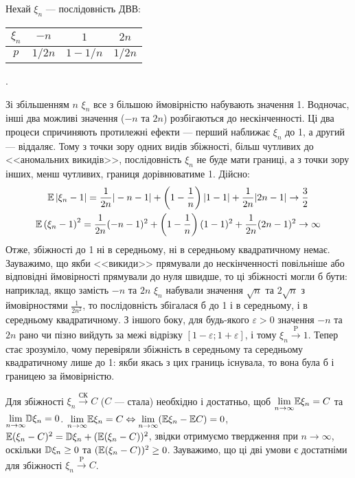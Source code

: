 \begin{example}
    Нехай $\xi_n$ --- послідовність ДВВ: 
        \begin{tabular}{|c|c|c|c|}
            \hline
            $\xi_n$ & $-n$ & $1$ & $2n$ \\
            \hline
            $p$ & $1/{2n}$ & $1 - 1/n$ & $1/{2n}$ \\
            \hline
        \end{tabular}.

    Зі збільшенням $n$ $\xi_n$ все з більшою ймовірністю набувають значення 1. 
    Водночас, інші два можливі значення ($-n$ та $2n$) розбігаються до нескінченності. 
    Ці два процеси спричиняють протилежні ефекти --- перший наближає $\xi_n$ до 1, а другий --- віддаляє. 
    Тому з точки зору одних видів збіжності, більш чутливих до <<аномальних викидів>>, послідовність $\xi_n$ не буде мати границі, 
    а з точки зору інших, менш чутливих, границя дорівнюватиме 1.
    Дійсно: 
    \begin{gather*}
        \mathbb{E}\left|\xi_n -1 \right| = \frac{1}{2n} |-n-1|  + \left( 1 - \frac{1}{n}\right)|1-1| + \frac{1}{2n}|2n-1| \to \frac{3}{2} \\
        \mathbb{E}\left(\xi_n -1 \right)^2 = \frac{1}{2n} (-n-1)^2  + \left( 1 - \frac{1}{n}\right)(1-1)^2 + \frac{1}{2n}(2n-1)^2 \to \infty
    \end{gather*}
    Отже, збіжності до 1 ні в середньому, ні в середньому квадратичному немає. Зауважимо, що якби <<викиди>> прямували до нескінченності повільніше або відповідні
    ймовірності прямували до нуля швидше, то ці збіжності могли б бути: наприклад, якщо замість $-n$ та $2n$ $\xi_n$ набували значення $\sqrt{n}$ та $2\sqrt{n}$
    з ймовірностями $\frac{1}{2n^2}$, то послідовність збігалася б до 1 і в середньому, і в середньому квадратичному.
    З іншого боку, для будь-якого $\varepsilon>0$ значення $-n$ та $2n$ рано чи пізно вийдуть за межі відрізку $[1-\varepsilon;1+\varepsilon]$, і тому
    $\xi_n \overset{\mathrm{P}}{\longrightarrow} 1$. Тепер стає зрозуміло, чому перевіряли збіжність в середньому та середньому квадратичному лише до 1: якби
    якась з цих границь існувала, то вона була б і границею за ймовірністю.
\end{example}
\begin{remark}Для збіжності $\xi_n \overset{\text{СК}}{\longrightarrow} C$ ($C$ --- стала) необхідно і достатньо, щоб
$\underset{n \to \infty}{\lim} \mathbb{E}\xi_n = C$ та $\underset{n \to \infty}{\lim} \mathbb{D}\xi_n = 0$.
$\underset{n \to \infty}{\lim} \mathbb{E}\xi_n = C \Leftrightarrow \underset{n \to \infty}{\lim} (\mathbb{E}\xi_n - \mathbb{E} C) = 0$,
$\mathbb{E}(\xi_n - C)^2 = \mathbb{D}\xi_n + (\mathbb{E}(\xi_n -C))^2$,
звідки отримуємо твердження при $n \to \infty$, оскільки $\mathbb{D}\xi_n \geq 0$ та $(\mathbb{E}(\xi_n -C))^2 \geq 0$.
Зауважимо, що ці дві умови є достатніми для збіжності $\xi_n \overset{\mathrm{P}}{\longrightarrow} C$.
\end{remark}
